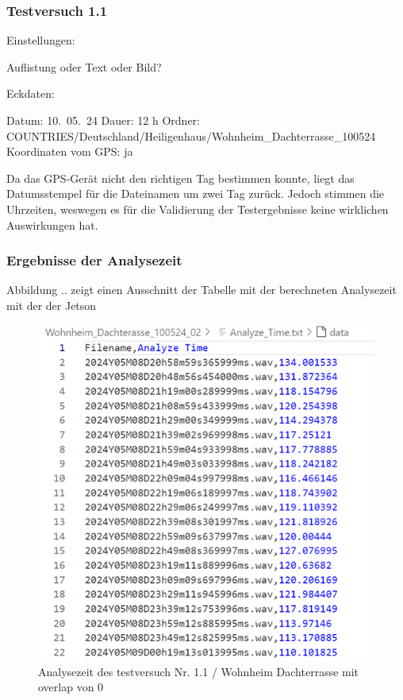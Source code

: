 
\subsubsection{Testversuch 1.1}

Einstellungen:

Auflistung oder Text oder Bild?

Eckdaten:

Datum: 10.~05.~24
Dauer: 12 h
Ordner: COUNTRIES/Deutschland/Heiligenhaus/Wohnheim\_Dachterrasse\_100524
Koordinaten vom GPS: ja




Da das GPS-Gerät nicht den richtigen Tag bestimmen konnte, liegt das Datumsstempel für die Dateinamen um zwei Tag zurück. Jedoch stimmen die Uhrzeiten, weswegen es für die Validierung der Testergebnisse keine wirklichen Auswirkungen hat.

\subsubsection{Ergebnisse der Analysezeit}

Abbildung .. zeigt einen Ausschnitt der Tabelle mit der berechneten Analysezeit mit der der Jetson 


\begin{figure}
    \centering
    \includegraphics[width=1\linewidth]{bilder/analyze_time_wohnheim.png}
    \caption{Analysezeit des testversuch Nr. 1.1 / Wohnheim Dachterrasse mit overlap von 0}
    \label{fig:enter-label}
\end{figure}

